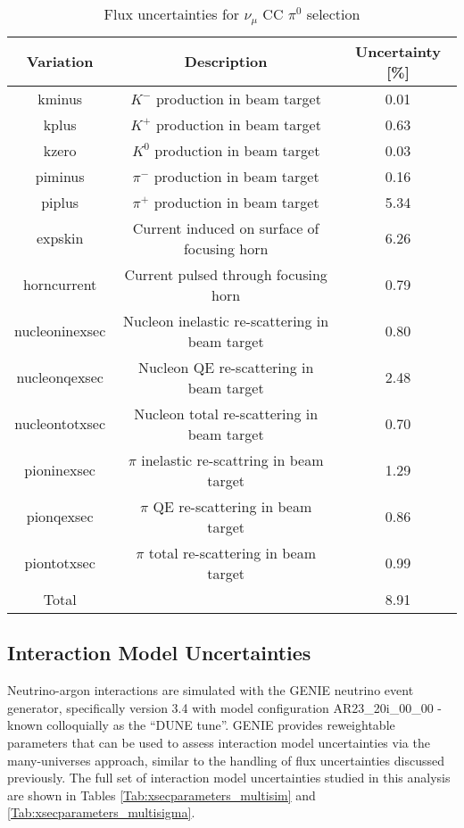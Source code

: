 \documentclass[../main.tex]{subfiles}
\begin{document}
\begin{table}[H]
    \caption{Flux uncertainties for $\nu_{\mu}$ CC $\pi^{0}$ selection}
    \vspace{0.1cm}
    \centering
    \begin{tabular}{ c c c } 
    \hline
    Variation & Description & Uncertainty [\%] \\
    \hline
    kminus & $K^{-}$ production in beam target & 0.01 \\
    kplus & $K^{+}$ production in beam target & 0.63 \\
    kzero & $K^{0}$ production in beam target & 0.03 \\
    piminus & $\pi^{-}$ production in beam target & 0.16 \\
    piplus & $\pi^{+}$ production in beam target & 5.34 \\
    expskin & Current induced on surface of focusing horn & 6.26 \\
    horncurrent & Current pulsed through focusing horn & 0.79 \\
    nucleoninexsec & Nucleon inelastic re-scattering in beam target & 0.80 \\
    nucleonqexsec & Nucleon QE re-scattering in beam target & 2.48 \\
    nucleontotxsec & Nucleon total re-scattering in beam target & 0.70 \\
    pioninexsec & $\pi$ inelastic re-scattring in beam target & 1.29 \\
    pionqexsec & $\pi$ QE re-scattering in beam target & 0.86 \\
    piontotxsec & $\pi$ total re-scattering in beam target & 0.99 \\
    \hline
    Total & & 8.91 \\
    \hline
    \end{tabular}
    \label{Tab:fluxparameters}
\end{table}

\subsection{Interaction Model Uncertainties}
Neutrino-argon interactions are simulated with the GENIE neutrino event generator, specifically version 3.4 with model configuration AR23\_20i\_00\_00 - known colloquially as the ``DUNE tune''.  GENIE provides reweightable parameters that can be used to assess interaction model uncertainties via the many-universes approach, similar to the handling of flux uncertainties discussed previously.  The full set of interaction model uncertainties studied in this analysis are shown in Tables \ref{Tab:xsecparameters_multisim} and \ref{Tab:xsecparameters_multisigma}.
\end{document}
